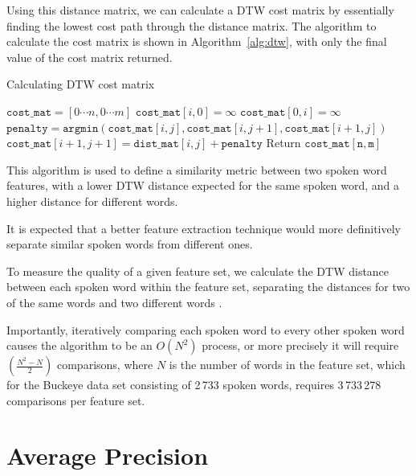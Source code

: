 Using this distance matrix, we can calculate a DTW cost matrix by essentially finding the lowest cost path through the distance matrix.
The algorithm to calculate the cost matrix is shown in Algorithm~\ref{alg:dtw}, with only the final value of the cost matrix returned.

\begin{algorithm}
    \caption{Calculating DTW cost matrix}
    \label{alg:dtw}
    \begin{algorithmic}
        \State $\mathtt{cost\_mat} = [0\cdots n, 0\cdots m]$
        \State $\mathtt{cost\_mat}[i, 0] = \infty$
        \EndFor
        \State $\mathtt{cost\_mat}[0, i] = \infty$
        \EndFor
        \State $\mathtt{penalty} = \mathtt{argmin}(\mathtt{cost\_mat}[i, j], \mathtt{cost\_mat}[i, j + 1], \mathtt{cost\_mat}[i+1, j])$
        \State $\mathtt{cost\_mat}[i+1, j+1] = \mathtt{dist\_mat}[i, j] + \mathtt{penalty}$
        \EndFor
        \EndFor
        \State Return $\mathtt{cost\_mat[n, m]}$
        \EndFunction
    \end{algorithmic}
\end{algorithm}

This algorithm is used to define a similarity metric between two spoken word features, with a lower DTW distance expected for the same spoken word, and a higher distance for different words.

It is expected that a better feature extraction technique would more definitively separate similar spoken words from different ones.

To measure the quality of a given feature set, we calculate the DTW distance between each spoken word within the feature set, separating the distances for two of the same words and two different words \cite{kamper_elsner_jansen_goldwater_2015}.

Importantly, iteratively comparing each spoken word to every other spoken word causes the algorithm to be an $O(N^2)$ process, or more precisely it will require $(\frac{N^2-N}{2})$ comparisons, where $N$ is the number of words in the feature set, which for the Buckeye data set consisting of 2\,733 spoken words, requires 3\,733\,278 comparisons per feature set.

\section{Average Precision}

